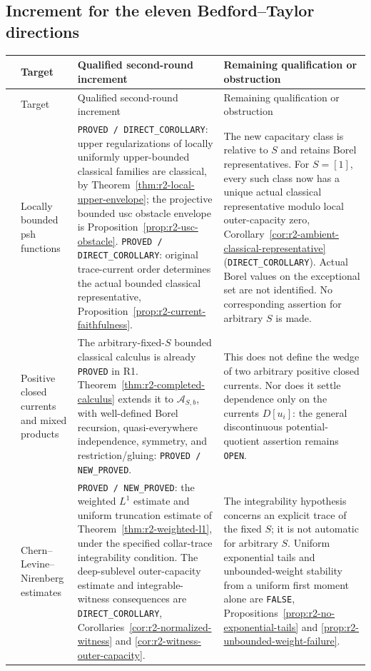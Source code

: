 \subsection{Increment for the eleven Bedford--Taylor directions}

\begin{longtable}{@{}>{\raggedright\arraybackslash}p{}>{\raggedright\arraybackslash}p{}>{\raggedright\arraybackslash}p{}>{\raggedright\arraybackslash}p{}@{}}
\hline
 & Target & Qualified second-round increment & Remaining qualification or obstruction\\
\hline
\endfirsthead
\hline
 & Target & Qualified second-round increment & Remaining qualification or obstruction\\
\hline
\endhead
1 & Locally bounded psh functions &
\texttt{PROVED / DIRECT\_COROLLARY}: upper regularizations of locally
uniformly upper-bounded classical families are classical, by
Theorem~\ref{thm:r2-local-upper-envelope}; the projective bounded usc
obstacle envelope is Proposition~\ref{prop:r2-usc-obstacle}.
\texttt{PROVED / DIRECT\_COROLLARY}: original trace-current order determines
the actual bounded classical representative,
Proposition~\ref{prop:r2-current-faithfulness}. &
The new capacitary class is relative to $S$ and retains Borel
representatives. For $S=[1]$, every such class now has a unique
actual classical representative modulo local outer-capacity zero,
Corollary~\ref{cor:r2-ambient-classical-representative}
(\texttt{DIRECT\_COROLLARY}). Actual Borel values on the exceptional
set are not identified. No corresponding assertion for arbitrary
$S$ is made.\\[5pt]

2 & Positive closed currents and mixed products &
The arbitrary-fixed-$S$ bounded classical calculus is already
\texttt{PROVED} in R1. Theorem~\ref{thm:r2-completed-calculus} extends
it to $\mathcal A_{S,b}$, with well-defined Borel recursion,
quasi-everywhere independence, symmetry, and restriction/gluing:
\texttt{PROVED / NEW\_PROVED}. &
This does not define the wedge of two arbitrary positive closed
currents. Nor does it settle dependence only on the currents $D[u_i]$:
the general discontinuous potential-quotient assertion remains
\texttt{OPEN}.\\[5pt]

3 & Chern--Levine--Nirenberg estimates &
\texttt{PROVED / NEW\_PROVED}: the weighted $L^1$ estimate and uniform
truncation estimate of Theorem~\ref{thm:r2-weighted-l1}, under the
specified collar-trace integrability condition. The deep-sublevel
outer-capacity estimate and integrable-witness consequences are
\texttt{DIRECT\_COROLLARY},
Corollaries~\ref{cor:r2-normalized-witness} and
\ref{cor:r2-witness-outer-capacity}. &
The integrability hypothesis concerns an explicit trace of the fixed
$S$; it is not automatic for arbitrary $S$. Uniform exponential tails
and unbounded-weight stability from a uniform first moment alone are
\texttt{FALSE}, Propositions~\ref{prop:r2-no-exponential-tails} and
\ref{prop:r2-unbounded-weight-failure}.\\[5pt]


\end{longtable}
